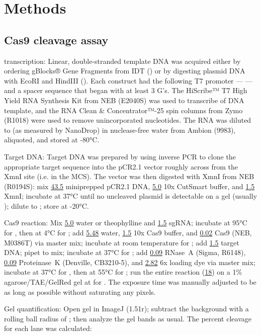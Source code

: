 \documentclass{article}
\begin{document}
\section{Methods}

\subsection{ Cas9 cleavage assay}

 transcription: Linear, double-stranded template DNA was 
acquired either by ordering gBlocks® Gene Fragments from IDT () or by 
digesting plasmid DNA with EcoRI and HindIII ().  Each construct had 
the following T7 promoter ---  --- and a spacer 
sequence that began with at least 3 G's.  The HiScribe™ T7 High Yield RNA 
Synthesis Kit from NEB (E2040S) was used to transcribe  of DNA 
template, and the RNA Clean \& Concentrator™-25 spin columns from Zymo (R1018) 
were used to remove unincorporated nucleotides.  The RNA was diluted to 
 (as measured by NanoDrop) in nuclease-free water from Ambion (9983), 
aliquoted, and stored at -80°C.  

Target DNA: Target DNA was prepared by using inverse PCR to clone the 
appropriate target sequence into the pCR2.1 vector roughly across from the XmnI 
site (i.e. in the MCS).  The vector was then digested with XmnI from NEB 
(R0194S): mix \ul{43.5}  miniprepped pCR2.1 DNA, \ul{5.0} 10x 
CutSmart buffer, and \ul{1.5}  XmnI; incubate at 37°C until no 
uncleaved plasmid is detectable on a gel (usually ); dilute to ; 
store at -20°C.  

Cas9 reaction: Mix \ul{5.0} water or  theophylline and \ul{1.5} 
sgRNA; incubate at 95°C for , then at 4°C for ; add \ul{5.48} 
water, \ul{1.5} 10x Cas9 buffer, and \ul{0.02}  Cas9 (NEB, M0386T) via 
master mix; incubate at room temperature for ; add \ul{1.5}  
target DNA; pipet to mix; incubate at 37°C for ; add \ul{0.09}  
RNase~A (Sigma, R6148), \ul{0.09}  Proteinase~K (Denville, CB3210-5), 
and \ul{2.82} 6x loading dye via master mix; incubate at 37°C for , 
then at 55°C for ; run the entire reaction (\ul{18}) on a 1\% 
agarose/TAE/GelRed gel at  for .  The exposure time was 
manually adjusted to be as long as possible without saturating any pixels.

Gel quantification: Open gel in ImageJ (1.51r); subtract the background with a 
rolling ball radius of ; then analyze the gel bands as usual.  The 
percent cleavage for each lane was calculated:
\end{document}
